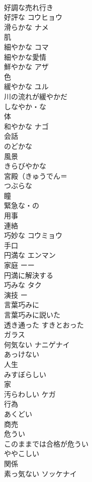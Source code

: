 \documentclass[8pt]{extreport}
\begin{document}
\begin{CJK}{UTF8}{min}
\\	好調な売れ行き
\\	好評な	コウヒョウ 
\\	滑らかな	ナメ 
\\	肌
\\	細やかな	コマ 
\\	細やかな愛情
\\	鮮やかな	アザ 
\\	色
\\	緩やかな	ユル 
\\	川の流れが緩やかだ
\\	しなやか・な	
\\	体
\\	和やかな	ナゴ 
\\	会話
\\	のどかな	
\\	風景
\\	きらびやかな	
\\	宮殿（きゅうでん＝
\\	つぶらな	
\\	瞳
\\	緊急な・の	
\\	用事 
\\	連絡
\\	巧妙な	コウミョウ 
\\	手口
\\	円満な	エンマン 
\\	家庭 ーー
\\	円満に解決する 
\\	巧みな	タク 
\\	演技 ー
\\	言葉巧みに　
\\	言葉巧みに説いた　
\\	透き通った	すきとおった 
\\	ガラス
\\	何気ない	ナニゲナイ 
\\	あっけない	
\\	人生
\\	みすぼらしい	
\\	家
\\	汚らわしい	ケガ 
\\	行為
\\	あくどい	
\\	商売　
\\	危うい	
\\	このままでは合格が危うい
\\	ややこしい	
\\	関係
\\	素っ気ない	ソッケナイ 

\end{CJK}
\end{document}
